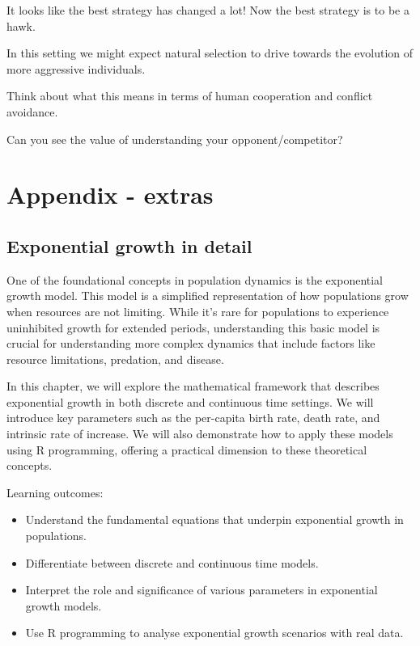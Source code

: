 \documentclass[
  a4paper]{book}
\providecommand{\tightlist}{%
  \setlength{\itemsep}{0pt}\setlength{\parskip}{0pt}}
\begin{document}
It looks like the best strategy has changed a lot! Now the best strategy is to be a hawk.

In this setting we might expect natural selection to drive towards the evolution of more aggressive individuals.

Think about what this means in terms of human cooperation and conflict avoidance.

Can you see the value of understanding your opponent/competitor?

\part{Appendix - extras}\label{part-appendix---extras}

\chapter{Exponential growth in detail}\label{exponential-growth-in-detail}

One of the foundational concepts in population dynamics is the exponential growth model. This model is a simplified representation of how populations grow when resources are not limiting. While it's rare for populations to experience uninhibited growth for extended periods, understanding this basic model is crucial for understanding more complex dynamics that include factors like resource limitations, predation, and disease.

In this chapter, we will explore the mathematical framework that describes exponential growth in both discrete and continuous time settings. We will introduce key parameters such as the per-capita birth rate, death rate, and intrinsic rate of increase. We will also demonstrate how to apply these models using R programming, offering a practical dimension to these theoretical concepts.

\begin{do-something}
Learning outcomes:

\begin{itemize}
\tightlist
\item
  Understand the fundamental equations that underpin exponential growth
  in populations.
\item
  Differentiate between discrete and continuous time models.
\item
  Interpret the role and significance of various parameters in
  exponential growth models.
\item
  Use R programming to analyse exponential growth scenarios with real
  data.
\end{itemize}
\end{do-something}
\end{document}
